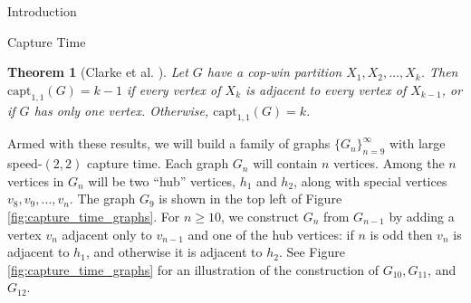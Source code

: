 \documentclass[12pt]{amsart}
\newcommand{\comment}[1]{\textcolor{red}{#1}}
\newtheorem{theorem}[lemma]{Theorem}
\theoremstyle{definition}
\begin{document}
\begin{section}{Introduction}
\begin{section}{Capture Time}

\begin{theorem}[Clarke et al. \cite{CFM14}]\label{thm:capture_time_partition}
Let $G$ have a cop-win partition $X_1,X_2,\dots,X_k$. Then $\mathrm{capt}_{1,1}(G)= k-1$ if every vertex of $X_k$ is adjacent to every vertex of $X_{k-1}$, or if $G$ has only one vertex.  Otherwise, $\mathrm{capt}_{1,1}(G) = k$.
\end{theorem}


Armed with these results, we will build a family of graphs $\{G_n\}_{n=9}^\infty$ with large speed-$(2,2)$ capture time.  Each graph $G_n$ will contain $n$ vertices.  Among the $n$ vertices in $G_n$ will be two ``hub'' vertices, $h_1$ and $h_2$, along with special vertices $v_8, v_9, \dots, v_n$.  The graph $G_9$ is shown in the top left of Figure \ref{fig:capture_time_graphs}.  For $n\ge 10$, we construct $G_n$ from $G_{n-1}$ by adding a vertex $v_{n}$ adjacent only to $v_{n-1}$ and one of the hub vertices: if $n$ is odd then $v_n$ is adjacent to $h_1$, and otherwise it is adjacent to $h_2$.  See Figure \ref{fig:capture_time_graphs} for an illustration of the construction of $G_{10}, G_{11}$, and $G_{12}$.  

\begin{figure}[ht]
\hfill\,
\end{figure}
\end{section}
\end{section}
\end{document}
